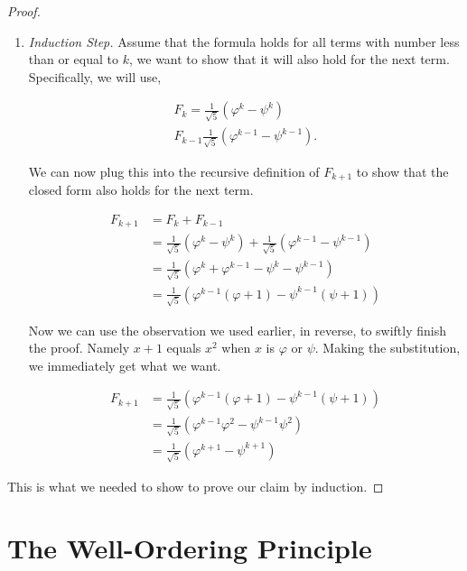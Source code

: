 \documentclass[twoside]{report}
\begin{document}
\begin{proof}
\begin{enumerate}
		\item \emph{Induction Step.} Assume that the formula holds for all terms with number less than or equal to $k$, we want to show that it will also hold for the next term. Specifically, we will use,
		
		\begin{align*}
			F_k = \frac{1}{\sqrt{5}} \left( \varphi^k - \psi^k \right) \\
			F_{k - 1} \frac{1}{\sqrt{5}} \left( \varphi^{k - 1} - \psi^{k - 1} \right).
		\end{align*}
		
		We can now plug this into the recursive definition of $F_{k + 1}$ to show that the closed form also holds for the next term.
		
		\begin{align*}
			F_{k + 1} &= F_k + F_{k - 1} \\
			&= \frac{1}{\sqrt{5}} \left( \varphi^k - \psi^k \right) +\frac{1}{\sqrt{5}} \left( \varphi^{k - 1} - \psi^{k - 1} \right) \\
			&= \frac{1}{\sqrt{5}} \left( \varphi^k + \varphi^{k - 1} - \psi^k - \psi^{k - 1} \right) \\
			&= \frac{1}{\sqrt{5}} \left( \varphi^{k - 1} (\varphi + 1) - \psi^{k - 1} (\psi + 1) \right)
		\end{align*}
		
		Now we can use the observation we used earlier, in reverse, to swiftly finish the proof. Namely $x + 1$ equals $x^2$ when $x$ is $\varphi$ or $\psi$. Making the substitution, we immediately get what we want.
		
		\begin{align*}
			F_{k + 1} &= \frac{1}{\sqrt{5}} \left( \varphi^{k - 1} (\varphi + 1) - \psi^{k - 1} (\psi + 1) \right) \\
			&= \frac{1}{\sqrt{5}} \left( \varphi^{k - 1} \varphi^2 - \psi^{k - 1} \psi^2 \right) \\
			&= \frac{1}{\sqrt{5}} \left( \varphi^{k + 1} - \psi^{k + 1} \right)
		\end{align*}
	\end{enumerate}
	This is what we needed to show to prove our claim by induction.
\end{proof}
\vspace{\baselineskip}

\section{The Well-Ordering Principle}
\end{document}

